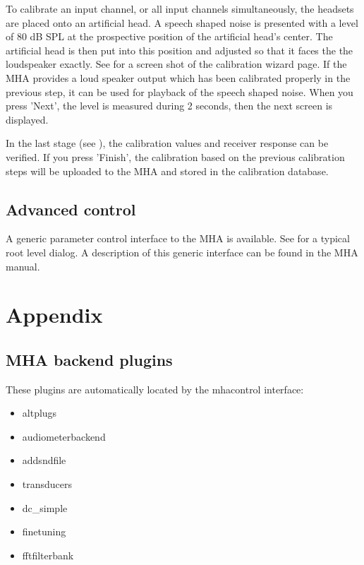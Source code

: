 \documentclass[11pt,a4paper,twoside]{article}
\begin{document}

To calibrate an input channel, or all input channels simultaneously,
the headsets are placed onto an artificial head.
A speech shaped noise is presented with a level of 80
dB SPL at the prospective position of the artificial head's center.
The artificial head is then put into this position and adjusted so that it 
faces the the loudspeaker exactly. 
%
See  for a screen shot of the
calibration wizard page.
%
If the MHA provides a loud speaker output which has been
calibrated properly in the previous step, it can be used for playback
of the speech shaped noise.
%
When you press 'Next', the level is measured during 2 seconds, then
the next screen is displayed.


In the last stage (see ), the
calibration values and receiver response can be verified.
%
If you press 'Finish', the calibration based on the previous
calibration steps will be uploaded to the MHA and stored in the
calibration database.


\subsection{Advanced control}\label{sec:advanced}

A generic parameter control interface to the MHA is available. See
 for a typical root level dialog.
%
A description of this generic interface can be found in the MHA
manual.


\section{Appendix}

\subsection{MHA backend plugins}

These plugins are automatically located by the mhacontrol interface:
%
\begin{itemize}
\item altplugs
\item audiometerbackend
\item addsndfile
\item transducers
\item dc\_simple
\item finetuning
\item fftfilterbank
\end{itemize}



\printindex
\end{document}
